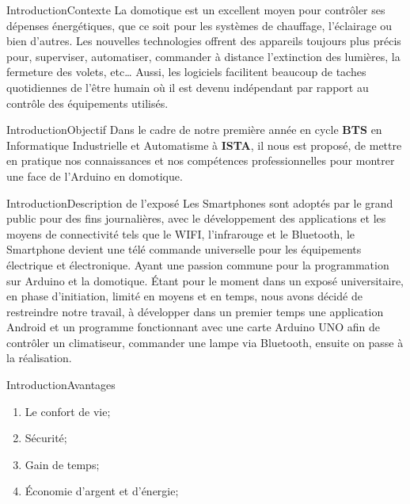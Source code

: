 \documentclass{beamer}
\begin{document}
	
	\begin{frame}{Introduction}{Contexte}
		La domotique est un excellent moyen pour contrôler ses dépenses énergétiques, que ce soit pour les systèmes de chauffage, l'éclairage ou bien d'autres. Les nouvelles technologies offrent des appareils toujours plus précis pour, superviser, automatiser, commander à distance l'extinction des lumières, la fermeture des volets, etc… Aussi, les logiciels facilitent beaucoup de taches quotidiennes de l'être humain où il est devenu indépendant par rapport au contrôle des équipements utilisés.
	\end{frame}
	
	\begin{frame}{Introduction}{Objectif}
		Dans le cadre de notre première année en cycle \textbf{BTS} en Informatique Industrielle et Automatisme à \textbf{ISTA}, il nous est proposé,  de mettre en pratique nos connaissances et nos compétences professionnelles pour montrer une face de l'Arduino en domotique.
	\end{frame}
	
	\begin{frame}{Introduction}{Description de l'exposé}
		Les Smartphones sont adoptés par le grand public pour des fins journalières, avec le développement des applications et les moyens de connectivité tels que le WIFI, l'infrarouge et le Bluetooth, le Smartphone devient une télé commande universelle pour les équipements électrique et électronique.
		Ayant une passion commune pour la programmation sur Arduino et la domotique. Étant pour le moment dans un exposé universitaire, en phase d'initiation, limité en moyens et en temps, nous avons décidé de restreindre notre travail, à développer dans un premier temps une application Android et un programme fonctionnant avec une carte Arduino UNO afin de contrôler un climatiseur, commander une lampe via Bluetooth, ensuite on passe à la réalisation.
		
	\end{frame}
	
	\begin{frame}{Introduction}{Avantages}
		\begin{enumerate}
			\item Le confort de vie;
			\item Sécurité;
			\item Gain de temps;
			\item Économie d’argent et d'énergie;
		\end{enumerate}
	\end{frame}
	
\end{document}
